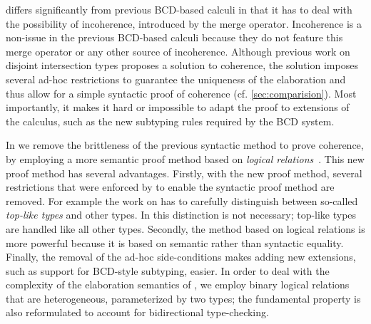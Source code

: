 
\namee differs significantly from previous BCD-based calculi in that it has to
deal with the possibility of incoherence, introduced by the merge operator. Incoherence
is a non-issue in the previous BCD-based calculi because they do not feature
this merge operator or any other source of incoherence.
Although previous work on disjoint intersection types
proposes a solution to coherence, the solution imposes several ad-hoc restrictions
to guarantee the uniqueness of the elaboration and thus allow for a simple
syntactic proof of coherence (cf. \cref{sec:comparision}). Most
importantly, it makes it hard or impossible to adapt the proof to extensions of
the calculus, such as the new subtyping rules required by the BCD system.

In \namee we remove the brittleness of the previous syntactic method to prove
coherence, by employing a more semantic proof method based on \emph{logical
  relations}~\citep{tait, plotkin1973lambda, statman1985logical}. This new proof method has several
advantages. Firstly, with the new proof method, several restrictions that were
enforced by \oname to enable the syntactic proof method are removed. For example
the work on \oname has to carefully distinguish between so-called \emph{top-like
  types} and other types.
In \namee this distinction is not necessary; top-like types are handled like all
other types. Secondly, the method based on logical relations is more powerful
because it is based on semantic rather than syntactic equality. Finally, the
removal of the ad-hoc side-conditions makes adding new extensions, such as
support for BCD-style subtyping, easier. In order to deal with the complexity of
the elaboration semantics of \namee, we employ binary logical relations that are
heterogeneous, parameterized by two types; the fundamental property is also
reformulated to account for bidirectional type-checking.





% 



